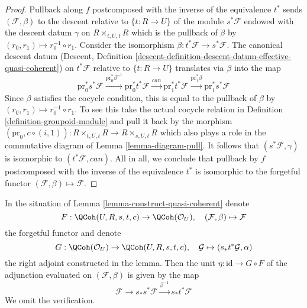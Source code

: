 \begin{proof}
\medskip\noindent
Pullback along $f$ postcomposed with the inverse of the equivalence $t^*$
sends $(\mathcal{F}, \beta)$ to the descent relative to $\{t : R \to U\}$
of the module $s^*\mathcal{F}$ endowed with the descent datum $\gamma$ on
$R \times_{t, U, t} R$ which is the pullback of $\beta$ by
$(r_0, r_1) \mapsto r_0^{-1} \circ r_1$.
Consider the isomorphism $\beta : t^*\mathcal{F} \to s^*\mathcal{F}$.
The canonical descent datum (Descent, Definition
\ref{descent-definition-descent-datum-effective-quasi-coherent})
on $t^*\mathcal{F}$ relative to $\{t : R \to U\}$
translates via $\beta$ into the map
$$
\text{pr}_0^*s^*\mathcal{F}
\xrightarrow{\text{pr}_0^*\beta^{-1}}
\text{pr}_0^*t^*\mathcal{F}
\xrightarrow{can}
\text{pr}_1^*t^*\mathcal{F}
\xrightarrow{\text{pr}_1^*\beta}
\text{pr}_1^*s^*\mathcal{F}
$$
Since $\beta$ satisfies the cocycle condition, this is equal to the pullback
of $\beta$ by $(r_0, r_1) \mapsto r_0^{-1} \circ r_1$. To see this
take the actual cocycle relation in Definition \ref{definition-groupoid-module}
and pull it back by the morphism
$(\text{pr}_0, c \circ (i, 1)) : R \times_{t, U, t} R \to R \times_{s, U, t} R$
which also plays a role in the commutative diagram of
Lemma \ref{lemma-diagram-pull}. It follows that
$(s^*\mathcal{F}, \gamma)$ is isomorphic to $(t^*\mathcal{F}, can)$.
All in all, we conclude that pullback by $f$ postcomposed with the
inverse of the equivalence $t^*$ is isomorphic to the forgetful functor
$(\mathcal{F}, \beta) \mapsto \mathcal{F}$.
\end{proof}

\begin{remark}
\label{remark-adjunction-map}
In the situation of Lemma \ref{lemma-construct-quasi-coherent} denote
$$
F : \QCoh(U, R, s, t, c) \to \QCoh(\mathcal{O}_U),\quad
(\mathcal{F}, \beta) \mapsto \mathcal{F}
$$
the forgetful functor and denote
$$
G : \QCoh(\mathcal{O}_U) \to \QCoh(U, R, s, t, c),\quad
\mathcal{G} \mapsto (s_*t^*\mathcal{G}, \alpha)
$$
the right adjoint constructed in the lemma. Then the unit
$\eta : \text{id} \to G \circ F$ of the adjunction evaluated
on $(\mathcal{F}, \beta)$ is given by the map
$$
\mathcal{F} \to s_*s^*\mathcal{F} \xrightarrow{\beta^{-1}} s_*t^*\mathcal{F}
$$
We omit the verification.
\end{remark}

